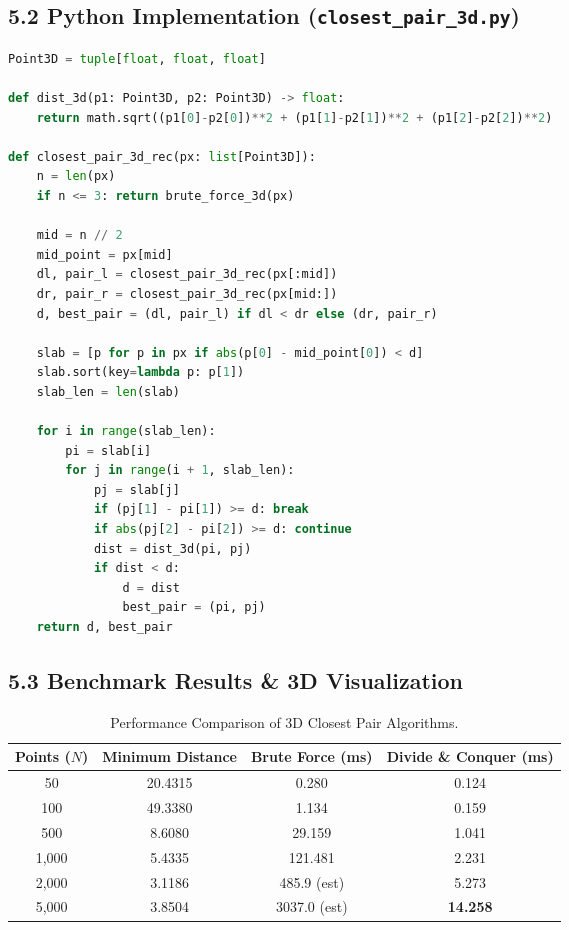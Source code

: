 \documentclass[12pt]{article}
\begin{document}
\subsection*{5.2 Python Implementation (\texttt{closest\_pair\_3d.py})}
\begin{lstlisting}[language=Python]
Point3D = tuple[float, float, float]

def dist_3d(p1: Point3D, p2: Point3D) -> float:
    return math.sqrt((p1[0]-p2[0])**2 + (p1[1]-p2[1])**2 + (p1[2]-p2[2])**2)

def closest_pair_3d_rec(px: list[Point3D]):
    n = len(px)
    if n <= 3: return brute_force_3d(px)

    mid = n // 2
    mid_point = px[mid]
    dl, pair_l = closest_pair_3d_rec(px[:mid])
    dr, pair_r = closest_pair_3d_rec(px[mid:])
    d, best_pair = (dl, pair_l) if dl < dr else (dr, pair_r)

    slab = [p for p in px if abs(p[0] - mid_point[0]) < d]
    slab.sort(key=lambda p: p[1])
    slab_len = len(slab)

    for i in range(slab_len):
        pi = slab[i]
        for j in range(i + 1, slab_len):
            pj = slab[j]
            if (pj[1] - pi[1]) >= d: break
            if abs(pj[2] - pi[2]) >= d: continue
            dist = dist_3d(pi, pj)
            if dist < d:
                d = dist
                best_pair = (pi, pj)
    return d, best_pair
\end{lstlisting}

\subsection*{5.3 Benchmark Results \& 3D Visualization}
\begin{table}[H]
\centering
\caption{Performance Comparison of 3D Closest Pair Algorithms.}
\label{tab:closest_pair_3d}
\vspace{0.2cm}
\begin{tabular}{cccc}
\toprule
\textbf{Points ($N$)} & \textbf{Minimum Distance} & \textbf{Brute Force (ms)} & \textbf{Divide \& Conquer (ms)} \\
\midrule
50    & 20.4315 & 0.280   & 0.124 \\
100   & 49.3380 & 1.134   & 0.159 \\
500   & 8.6080  & 29.159  & 1.041 \\
1,000 & 5.4335  & 121.481 & 2.231 \\
2,000 & 3.1186  & 485.9 (est) & 5.273 \\
5,000 & 3.8504  & 3037.0 (est)& \textbf{14.258} \\
\bottomrule
\end{tabular}
\end{table}
\end{document}
